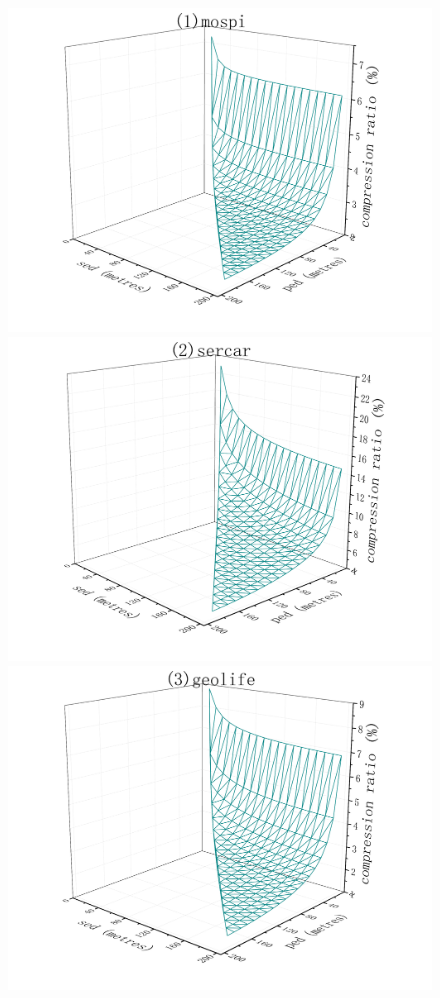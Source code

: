 {\begin{figure}[tb!]
	\centering
	\includegraphics[scale = 0.210]{figures/Fig-BITT-mopsi-compression-ratio.png}\hspace{1ex}
	\includegraphics[scale = 0.210]{figures/Fig-BITT-sercar-compression-ratio.png}\hspace{1ex}
	\includegraphics[scale = 0.210]{figures/Fig-BITT-geolife-compression-ratio.png}\hspace{1ex}

\end{figure}}
